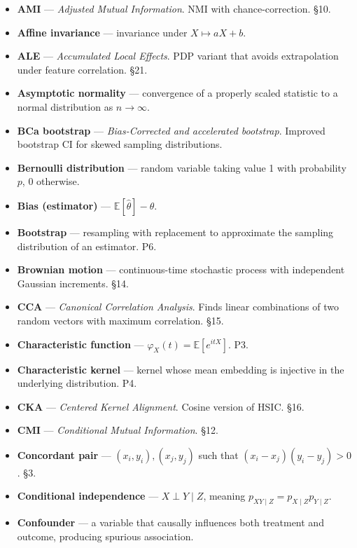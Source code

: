 \documentclass{article}
\providecommand{\tightlist}{\setlength{\itemsep}{0pt}\setlength{\parskip}{0pt}}
\begin{document}
\begin{itemize}
\tightlist
\item
  \textbf{AMI} --- \emph{Adjusted Mutual Information}. NMI with
  chance-correction. §10.
\item
  \textbf{Affine invariance} --- invariance under \(X \mapsto aX + b\).
\item
  \textbf{ALE} --- \emph{Accumulated Local Effects}. PDP variant that
  avoids extrapolation under feature correlation. §21.
\item
  \textbf{Asymptotic normality} --- convergence of a properly scaled
  statistic to a normal distribution as \(n \to \infty\).
\item
  \textbf{BCa bootstrap} --- \emph{Bias-Corrected and accelerated
  bootstrap}. Improved bootstrap CI for skewed sampling distributions.
\item
  \textbf{Bernoulli distribution} --- random variable taking value 1
  with probability \(p\), 0 otherwise.
\item
  \textbf{Bias (estimator)} --- \(\mathbb{E}[\hat{\theta}] - \theta\).
\item
  \textbf{Bootstrap} --- resampling with replacement to approximate the
  sampling distribution of an estimator. P6.
\item
  \textbf{Brownian motion} --- continuous-time stochastic process with
  independent Gaussian increments. §14.
\item
  \textbf{CCA} --- \emph{Canonical Correlation Analysis}. Finds linear
  combinations of two random vectors with maximum correlation. §15.
\item
  \textbf{Characteristic function} ---
  \(\varphi_X(t) = \mathbb{E}[e^{itX}]\). P3.
\item
  \textbf{Characteristic kernel} --- kernel whose mean embedding is
  injective in the underlying distribution. P4.
\item
  \textbf{CKA} --- \emph{Centered Kernel Alignment}. Cosine version of
  HSIC. §16.
\item
  \textbf{CMI} --- \emph{Conditional Mutual Information}. §12.
\item
  \textbf{Concordant pair} --- \((x_i, y_i), (x_j, y_j)\) such that
  \((x_i - x_j)(y_i - y_j) > 0\). §3.
\item
  \textbf{Conditional independence} --- \(X \perp Y \mid Z\), meaning
  \(p_{XY \mid Z} = p_{X \mid Z} p_{Y \mid Z}\).
\item
  \textbf{Confounder} --- a variable that causally influences both
  treatment and outcome, producing spurious association.

\end{itemize}
\end{document}
